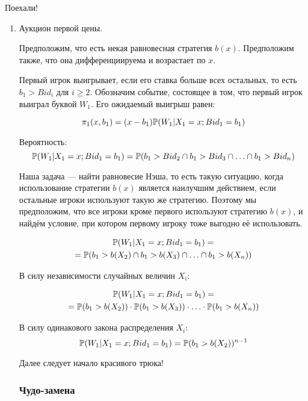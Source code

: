 Поехали!
\begin{enumerate}
\item Аукцион первой цены.

Предположим, что есть некая равновесная стратегия $ b(x) $. Предположим также, что она дифференциируема и возрастает по $x$.

Первый игрок выигрывает, если его ставка больше всех остальных, то есть $ b_{1}>Bid_{i} $ для $ i\geq 2 $. Обозначим событие, состоящее в том, что первый игрок выиграл буквой $ W_{1} $. Его ожидаемый выигрыш равен:


\begin{equation}
\label{first_price_eq}
\pi_{1}(x,b_{1})=(x-b_{1})\P(W_{1}|X_{1}=x; Bid_{1}=b_{1})
\end{equation}

Вероятность:
\begin{equation}
\P(W_{1}|X_{1}=x; Bid_{1}=b_{1})=\P(b_{1}>Bid_{2} \cap b_{1}>Bid_{3} \cap \ldots \cap b_{1}>Bid_{n})
\end{equation}


Наша задача — найти равновесие Нэша, то есть такую ситуацию, когда использование стратегии $ b(x) $ является наилучшим действием, если остальные игроки используют такую же стратегию. Поэтому мы предположим, что все игроки кроме первого используют стратегию $ b(x) $, и найдём условие, при котором первому игроку тоже выгодно её использовать.

\begin{multline}
\P(W_{1}|X_{1}=x; Bid_{1}=b_{1})=\\
=\P(b_{1}>b(X_{2}) \cap b_{1}>b(X_{3}) \cap \ldots \cap b_{1}>b(X_{n}))
\end{multline}

В силу независимости случайных величин $ X_{i} $:

\begin{multline}
\P(W_{1}|X_{1}=x; Bid_{1}=b_{1})=\\
=\P(b_{1}>b(X_{2}))\cdot \P(b_{1}>b(X_{3}))\cdot \ldots\cdot \P(b_{1}>b(X_{n}))
\end{multline}

В силу одинакового закона распределения $ X_{i} $:
\begin{equation}
\P(W_{1}|X_{1}=x; Bid_{1}=b_{1})=\P(b_{1}>b(X_{2}))^{n-1}
\end{equation}



Далее следует начало красивого трюка!

\subsubsection*{Чудо-замена}


\end{enumerate}
